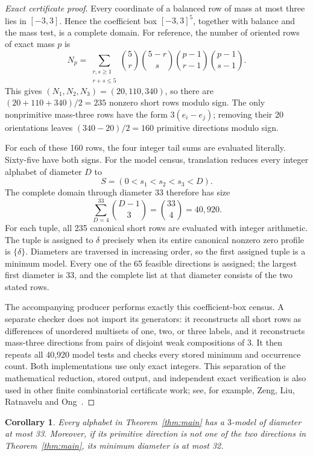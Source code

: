 \documentclass[11pt]{article}
\newtheorem{corollary}[theorem]{Corollary}
\theoremstyle{definition}
\begin{document}
\begin{proof}[Exact certificate proof]
Every coordinate of a balanced row of mass at most three lies in
$[-3,3]$.  Hence the coefficient box $[-3,3]^5$, together with balance and
the mass test, is a complete domain.  For reference, the number of oriented
rows of exact mass $p$ is
\[
 N_p=\sum_{\substack{r,s\geq1\\r+s\leq5}}
   \binom5r\binom{5-r}s
   \binom{p-1}{r-1}\binom{p-1}{s-1}.
\]
This gives $(N_1,N_2,N_3)=(20,110,340)$, so there are
$(20+110+340)/2=235$ nonzero short rows modulo sign.  The only nonprimitive
mass-three rows have the form $3(e_i-e_j)$; removing their 20 orientations
leaves $(340-20)/2=160$ primitive directions modulo sign.

For each of these 160 rows, the four integer tail sums are evaluated
literally.  Sixty-five have both signs.  For the model census, translation
reduces every integer alphabet of diameter $D$ to
\[
                 S=(0<s_1<s_2<s_3<D).
\]
The complete domain through diameter 33 therefore has size
\[
 \sum_{D=4}^{33}\binom{D-1}{3}=\binom{33}{4}=40{,}920.
\]
For each tuple, all 235 canonical short rows are evaluated with integer
arithmetic.  The tuple is assigned to $\delta$ precisely when its entire
canonical nonzero zero profile is $\{\delta\}$.  Diameters are traversed in
increasing order, so the first assigned tuple is a minimum model.  Every one
of the 65 feasible directions is assigned; the largest first diameter is 33,
and the complete list at that diameter consists of the two stated rows.

The accompanying producer performs exactly this coefficient-box census.  A
separate checker does not import its generators: it reconstructs all short
rows as differences of unordered multisets of one, two, or three labels, and
it reconstructs mass-three directions from pairs of disjoint weak
compositions of 3.  It then repeats all 40,920 model tests and checks every
stored minimum and occurrence count.  Both implementations use only exact
integers.  This separation of the mathematical reduction, stored output,
and independent exact verification is also used in other finite
combinatorial certificate work; see, for example,
Zeng, Liu, Ratnavelu and Ong~\cite{ZengEtAl2026FiniteCertificates}.
\end{proof}

\begin{corollary}\label{cor:upper}
Every alphabet in Theorem~\ref{thm:main} has a $3$-model of diameter at most
33.  Moreover, if its primitive direction is not one of the two directions
in Theorem~\ref{thm:main}, its minimum diameter is at most 32.
\end{corollary}
\end{document}

